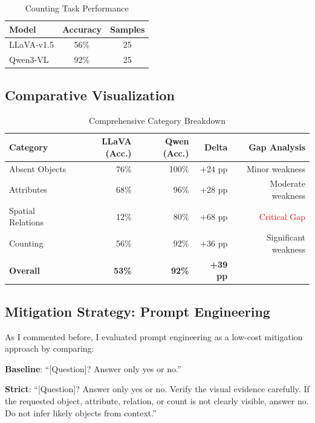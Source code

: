 \documentclass[11pt,a4paper]{article}
\begin{document}
\vspace{10pt}
\begin{table}[H]
\centering
\begin{tabular}{lcc}
\toprule
\textbf{Model} & \textbf{Accuracy} & \textbf{Samples} \\
\midrule
LLaVA-v1.5 & 56\% & 25 \\
Qwen3-VL & 92\% & 25 \\
\bottomrule
\end{tabular}
\caption{Counting Task Performance}
\end{table}

\subsection{Comparative Visualization}

\vspace{5pt}
\begin{table}[H]
\centering
\begin{tabular}{lrrrr}
\toprule
\textbf{Category} & \textbf{LLaVA (Acc.)} & \textbf{Qwen (Acc.)} & \textbf{Delta} & \textbf{Gap Analysis} \\
\midrule
Absent Objects & 76\% & 100\% & +24 pp & Minor weakness \\
Attributes & 68\% & 96\% & +28 pp & Moderate weakness \\
Spatial Relations & 12\% & 80\% & +68 pp & \textcolor{red}{Critical Gap} \\
Counting & 56\% & 92\% & +36 pp & Significant weakness \\
\midrule
\textbf{Overall} & \textbf{53\%} & \textbf{92\%} & \textbf{+39 pp} & \\
\bottomrule
\end{tabular}
\caption{Comprehensive Category Breakdown}
\end{table}

\subsection{Mitigation Strategy: Prompt Engineering}

As I commented before, I evaluated prompt engineering as a low-cost mitigation approach by comparing:

\textbf{Baseline}: ``[Question]? Answer only yes or no.''

\textbf{Strict}: ``[Question]? Answer only yes or no. Verify the visual evidence carefully. If the requested object, attribute, relation, or count is not clearly visible, answer no. Do not infer likely objects from context.''
\end{document}
